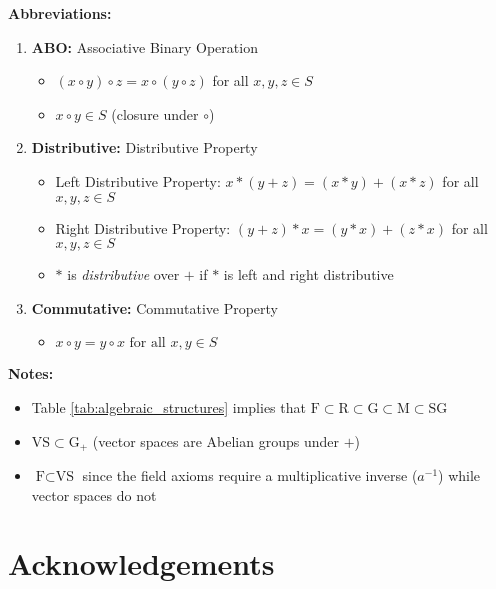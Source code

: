 \documentclass[11pt, oneside]{article}   	%
\begin{document}
\noindent
\textbf{Abbreviations:}

\begin{enumerate}
\item \textbf{ABO:} Associative Binary Operation 
\begin{itemize}
\item $(x \circ y) \circ z = x \circ  (y \circ z)$  for all $x, y, z \in S$
\item $x \circ y \in S$ (closure under $\circ$)
\end{itemize}

\item \textbf{Distributive:} Distributive Property 
\begin{itemize}
\item Left Distributive Property: $x * (y+z )= (x*y) + (x*z)$ for all $x, y, z \in S$
\item Right Distributive Property: $(y + z) * x = (y*x) + (z*x)$ for all $x, y, z \in S$
\item $*$ is \emph{distributive} over $+$ if $*$ is left and right distributive
\end{itemize}

\item \textbf{Commutative:} Commutative Property
\begin{itemize}
\item $x \circ y = y \circ x {\mbox{ for all }}x,y\in S$
\end{itemize}
\end{enumerate}


\noindent
\textbf{Notes:}
\begin{itemize}
\item Table \ref{tab:algebraic_structures} implies that $\text{F} \subset \text{R} \subset \text{G} \subset \text{M} \subset \text{SG}$
\item $\text{VS} \subset \text{G}_{+}$ (vector spaces are Abelian groups under $+$)
\item $\text{F} \subset \text{VS}$ since the field axioms require a multiplicative inverse ($a^{-1}$) while vector spaces do not
\end{itemize}


\section{Acknowledgements}

\newpage


\end{document}
